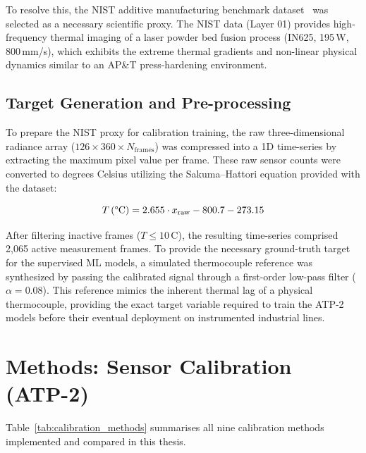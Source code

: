 To resolve this, the NIST additive manufacturing benchmark dataset~\cite{nist_dataset} was selected as a necessary scientific proxy. The NIST data (Layer 01) provides high-frequency thermal imaging of a laser powder bed fusion process (IN625, 195\,W, 800\,mm/s), which exhibits the extreme thermal gradients and non-linear physical dynamics similar to an AP\&T press-hardening environment.

\subsection{Target Generation and Pre-processing}
To prepare the NIST proxy for calibration training, the raw three-dimensional radiance array ($126 \times 360 \times N_\text{frames}$) was compressed into a 1D time-series by extracting the maximum pixel value per frame. These raw sensor counts were converted to degrees Celsius utilizing the Sakuma--Hattori equation provided with the dataset:

\begin{equation}
T\,(\text{\textdegree C}) = 2.655 \cdot x_{\text{raw}} - 800.7 - 273.15
\label{eq:sakuma}
\end{equation}

After filtering inactive frames ($T \leq 10$\,\textdegree C), the resulting time-series comprised 2,065 active measurement frames. To provide the necessary ground-truth target for the supervised ML models, a simulated thermocouple reference was synthesized by passing the calibrated signal through a first-order low-pass filter ($\alpha = 0.08$). This reference mimics the inherent thermal lag of a physical thermocouple, providing the exact target variable required to train the ATP-2 models before their eventual deployment on instrumented industrial lines.

\section{Methods: Sensor Calibration (ATP-2)}
\label{sec:method_calibrate}

Table~\ref{tab:calibration_methods} summarises all nine calibration methods implemented and compared in this thesis.

